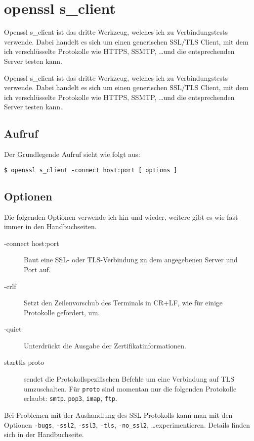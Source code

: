 \section{openssl s\_client}
\label{sec:netz-werkzeuge-openssl}
\begin{abstractsec}
  Openssl s\_client ist das dritte Werkzeug, welches ich zu Verbindungstests
  verwende. Dabei handelt es sich um einen generischen SSL/TLS Client, mit dem
  ich verschlüsselte Protokolle wie HTTPS, SSMTP, \ldots und die
  entsprechenden Server testen kann.
\end{abstractsec}
\begin{normaltext}
  Openssl s\_client ist das dritte Werkzeug, welches ich zu Verbindungstests
  verwende. Dabei handelt es sich um einen generischen SSL/TLS Client, mit dem
  ich verschlüsselte Protokolle wie HTTPS, SSMTP, \ldots und die
  entsprechenden Server testen kann.

  \subsection*{Aufruf}
  Der Grundlegende Aufruf sieht wie folgt aus:
  \begin{verbatim}
$ openssl s_client -connect host:port [ options ]
  \end{verbatim}
  
  \subsection*{Optionen}
  Die folgenden Optionen verwende ich hin und wieder, weitere gibt es wie
  fast immer in den Handbuchseiten.
  \begin{description}
    \item[-connect host:port] Baut eine SSL- oder TLS-Verbindung zu dem
      angegebenen Server und Port auf.
    \item[-crlf] Setzt den Zeilenvorschub des Terminals in CR+LF, wie für
      einige Protokolle gefordert, um.
    \item[-quiet] Unterdrückt die Ausgabe der Zertifikatinformationen.
    \item[starttls proto] sendet die Protokollspezifischen Befehle um eine
      Verbindung auf TLS umzuschalten. Für \verb?proto? sind momentan nur die
      folgenden Protokolle erlaubt: \verb?smtp?, \verb?pop3?, \verb?imap?,
      \verb?ftp?.
  \end{description}
  Bei Problemen mit der Aushandlung des SSL-Protokolls kann man mit den
  Optionen \verb?-bugs?, \verb?-ssl2?, \verb?-ssl3?, \verb?-tls?,
  \verb?-no_ssl2?, \ldots experimentieren. Details finden sich in der
  Handbuchseite.


\end{normaltext}
